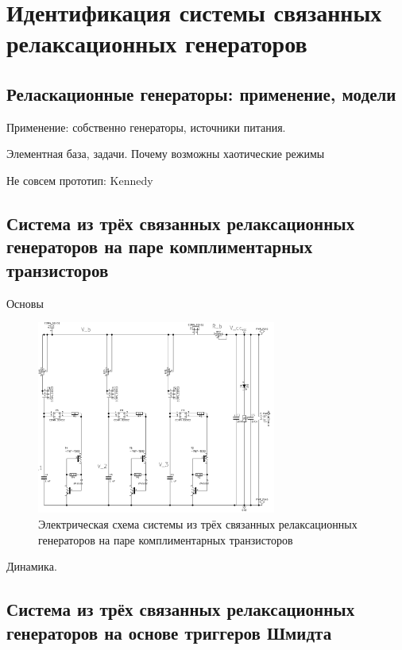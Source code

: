 \chapter{Идентификация системы связанных релаксационных генераторов}

\section{Реласкационные генераторы: применение, модели}

Применение: собственно генераторы, источники питания.

Элементная база, задачи. Почему возможны хаотические режимы

Не совсем прототип: Kennedy


\cite{mishenko_du_small_relax}

\section{Система из трёх связанных релаксационных генераторов на паре комплиментарных транзисторов}

Основы

\begin{figure}[htb!]
  \centerline{\includegraphics[width=0.7\textwidth]{p/relax3_schem.png} }
  \caption{Электрическая схема системы из трёх связанных релаксационных генераторов на паре комплиментарных транзисторов}
  \label{atu:relax3d_schem}
\end{figure}

Динамика.

\section{Система из трёх связанных релаксационных генераторов на основе триггеров Шмидта}


